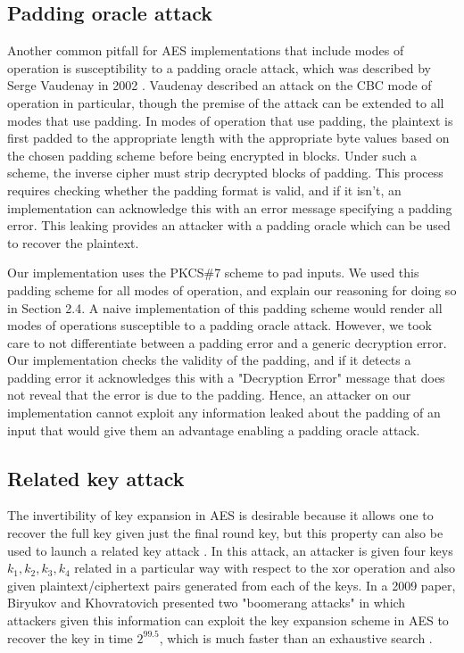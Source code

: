 \documentclass[a4paper,12pt]{article}
\begin{document}
\subsection{Padding oracle attack}

Another common pitfall for AES implementations that include modes of operation is susceptibility to a padding oracle attack, which was described by Serge Vaudenay in 2002 \cite{Vaudenay}. Vaudenay described an attack on the CBC mode of operation in particular, though the premise of the attack can be extended to all modes that use padding. In modes of operation that use padding, the plaintext is first padded to the appropriate length with the appropriate byte values based on the chosen padding scheme before being encrypted in blocks. Under such a scheme, the inverse cipher must strip decrypted blocks of padding. This process requires checking whether the padding format is valid, and if it isn't, an implementation can acknowledge this with an error message specifying a padding error. This leaking provides an attacker with a padding oracle which can be used to recover the plaintext.

Our implementation uses the PKCS\#7 scheme to pad inputs. We used this padding scheme for all modes of operation, and explain our reasoning for doing so in Section 2.4. A naive implementation of this padding scheme would render all modes of operations susceptible to a padding oracle attack. However, we took care to not differentiate between a padding error and a generic decryption error. Our implementation checks the validity of the padding, and if it detects a padding error it acknowledges this with a "Decryption Error" message that does not reveal that the error is due to the padding. Hence, an attacker on our implementation cannot exploit any information leaked about the padding of an input that would give them an advantage enabling a padding oracle attack.

\subsection{Related key attack}

The invertibility of key expansion in AES is desirable because it allows one to recover the full key given just the final round key, but this property can also be used to launch a related key attack \cite{Boneh}. In this attack, an attacker is given four keys $k_1,k_2,k_3,k_4$ related in a particular way with respect to the xor operation and  also given plaintext/ciphertext pairs generated from each of the keys. In a 2009 paper, Biryukov and Khovratovich presented two "boomerang attacks" in which attackers given this information can exploit the key expansion scheme in AES to recover the key in time $2^{99.5}$, which is much faster than an exhaustive search \cite{boomerang}.
\end{document}
